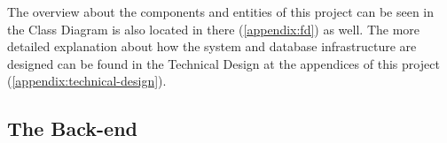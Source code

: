 The overview about the components and entities of this project can be
seen in the Class Diagram is also located in there  (\ref{appendix:fd}) as well. The more detailed explanation
about how the system and database infrastructure are designed can be found in the Technical Design at the appendices of this project
(\ref{appendix:technical-design}).

\subsection{The Back-end}



